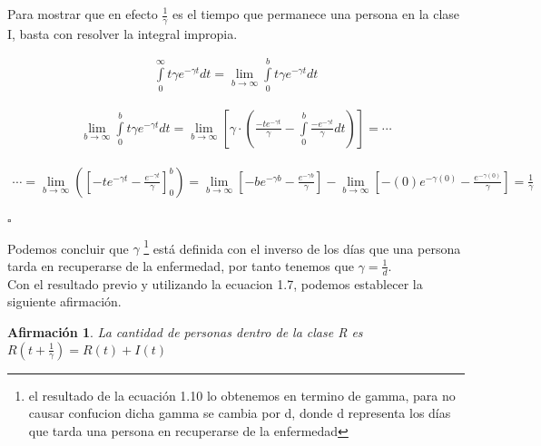 \documentclass[a4paper,openany,12pt]{book}
\newtheorem{Af}{Afirmación}
\begin{document}
\begin{Dem}

Para mostrar que en efecto $\frac{1}{\gamma}$ es el tiempo que permanece una persona en la clase I, basta con resolver la integral impropia.

\begin{align*} 
\int \limits_{0}^{\infty} t\gamma e^{-\gamma t} dt = \lim\limits_{b\rightarrow \infty} \int \limits_{0}^{b} t\gamma e^{-\gamma t}dt 
\end{align*}

\begin{align*}
\lim\limits_{b\rightarrow \infty} \int \limits_{0}^{b} t\gamma e^{-\gamma t}dt = \lim\limits_{b\rightarrow \infty} \left[ \gamma \cdot \left( \frac{-t e^{-\gamma t}}{\gamma} - \int \limits_{0}^{b} \frac{-e^{-\gamma t}}{\gamma} dt \right)\right] = \cdots
\end{align*}

\begin{align*}
\cdots = \lim\limits_{b\rightarrow \infty} \left( \left[ -te^{- \gamma t} - \frac{e^{-\gamma t}}{\gamma} \right]_0^b \right) = \lim\limits_{b\rightarrow \infty} \left[ -be^{- \gamma b} - \frac{e^{- \gamma b}}{\gamma} \right] - \lim\limits_{b\rightarrow \infty} \left[ -(0)e^{- \gamma (0)} - \frac{e^{- \gamma (0)}}{\gamma} \right] = \frac{1}{\gamma}  \\
\end{align*}

\hfill	$\square$

\end{Dem}

Podemos concluir que $\gamma$ \footnote{el resultado de la ecuación 1.10 lo obtenemos en termino de gamma, para no causar confucion dicha gamma se cambia por d, donde d representa los días que tarda una persona en recuperarse de la enfermedad} está definida con el inverso de los días que una persona tarda en recuperarse de la enfermedad, por tanto tenemos que $\gamma = \frac{1}{d}$.\\

Con el resultado previo y utilizando la ecuacion 1.7, podemos establecer la siguiente afirmación.

\begin{Af}
La cantidad de personas dentro de la clase R es $R(t+\frac{1}{\gamma}) = R(t) + I(t)$
\end{Af}
\end{document}
